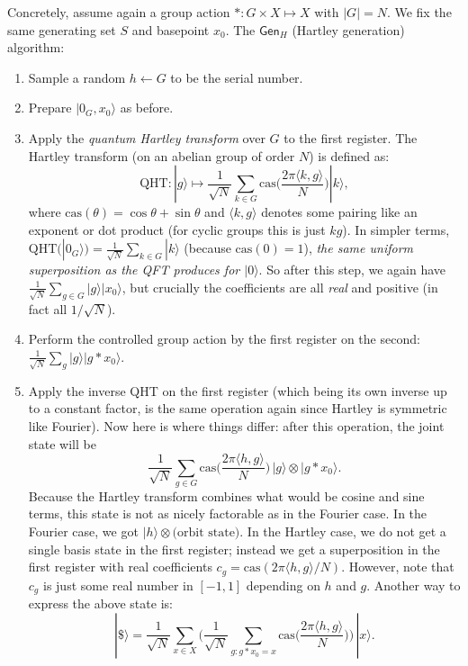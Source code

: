 \documentclass[12pt]{report}
\newcommand{\cas}{\mathrm{cas}}
\begin{document}
Concretely, assume again a group action $*: G\times X \mapsto X$ with $|G|=N$. We fix the same generating set $S$ and basepoint $x_0$. The $\mathsf{Gen}_{H}$ (Hartley generation) algorithm:
\begin{enumerate}
    \item Sample a random $h \leftarrow G$ to be the serial number.
    \item Prepare $|0_G, x_0\rangle$ as before.
    \item Apply the \emph{quantum Hartley transform} over $G$ to the first register. The Hartley transform (on an abelian group of order $N$) is defined as:
    \[
       \mathrm{QHT}: |g\rangle \mapsto \frac{1}{\sqrt{N}} \sum_{k \in G} \cas \Big(\frac{2\pi \langle k,g \rangle}{N}\Big) |k\rangle,
    \] 
    where $\mathrm{cas}(\theta) = \cos \theta + \sin \theta$ and $\langle k,g \rangle$ denotes some pairing like an exponent or dot product (for cyclic groups this is just $kg$). In simpler terms, $\mathrm{QHT}(|0_G\rangle) = \frac{1}{\sqrt{N}}\sum_{k \in G} |k\rangle$ (because $\cas(0)=1$), \emph{the same uniform superposition as the QFT produces for $|0\rangle$}. So after this step, we again have $\frac{1}{\sqrt{N}}\sum_{g \in G} |g\rangle|x_0\rangle$, but crucially the coefficients are all \emph{real} and positive (in fact all $1/\sqrt{N}$).
    \item Perform the controlled group action by the first register on the second: $\frac{1}{\sqrt{N}}\sum_{g} |g\rangle |g*x_0\rangle$.
    \item Apply the inverse QHT on the first register (which being its own inverse up to a constant factor, is the same operation again since Hartley is symmetric like Fourier). Now here is where things differ: after this operation, the joint state will be 
    \[
       \frac{1}{\sqrt{N}} \sum_{g \in G} \cas\Big(\frac{2\pi \langle h,g \rangle}{N}\Big)\, |g\rangle \otimes |g*x_0\rangle.
    \] 
    Because the Hartley transform combines what would be cosine and sine terms, this state is not as nicely factorable as in the Fourier case. In the Fourier case, we got $|h\rangle \otimes \text{(orbit state)}$. In the Hartley case, we do not get a single basis state in the first register; instead we get a superposition in the first register with real coefficients $c_g = \cas(2\pi\langle h,g\rangle/N)$. However, note that $c_g$ is just some real number in $[-1,1]$ depending on $h$ and $g$. Another way to express the above state is:
    \[
      |\$\rangle = \frac{1}{\sqrt{N}} \sum_{x \in X} \Big(\frac{1}{\sqrt{N}}\sum_{g: g*x_0 = x} \cas\big(\frac{2\pi \langle h,g \rangle}{N}\big)\Big)\, |x\rangle.
\]
\end{enumerate}
\end{document}
